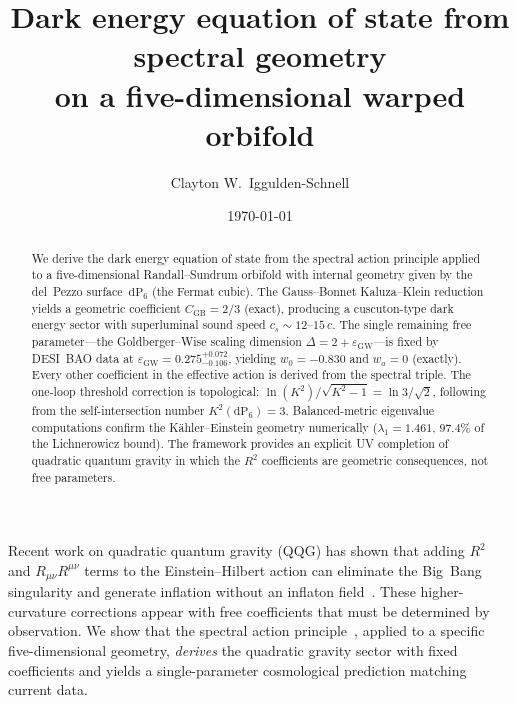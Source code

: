 \documentclass[aps,prl,twocolumn,superscriptaddress]{revtex4-2}
\newcommand{\CGB}{C_{\mathrm{GB}}}
\newcommand{\epsGW}{\varepsilon_{\mathrm{GW}}}
\newcommand{\dP}{\mathrm{dP}_6}
\begin{document}
\title{Dark energy equation of state from spectral geometry\\on a five-dimensional warped orbifold}

\author{Clayton W.\ Iggulden-Schnell}

\date{\today}

\begin{abstract}
We derive the dark energy equation of state from the spectral action principle
applied to a five-dimensional Randall--Sundrum orbifold with internal geometry
given by the del~Pezzo surface~$\dP$ (the Fermat cubic).  The Gauss--Bonnet
Kaluza--Klein reduction yields a geometric coefficient $\CGB = 2/3$ (exact),
producing a cuscuton-type dark energy sector with superluminal sound speed
$c_s \sim 12$--$15\,c$.  The single remaining free parameter---the
Goldberger--Wise scaling dimension $\Delta = 2 + \epsGW$---is fixed by
DESI~BAO data at $\epsGW = 0.275^{+0.072}_{-0.106}$, yielding $w_0 = -0.830$
and $w_a = 0$ (exactly).  Every other coefficient in the effective action is
derived from the spectral triple.  The one-loop threshold correction is
topological: $\ln(K^2)/\sqrt{K^2 - 1} = \ln 3/\sqrt{2}$, following from the
self-intersection number $K^2(\dP) = 3$.  Balanced-metric eigenvalue
computations confirm the K\"ahler--Einstein geometry numerically
($\lambda_1 = 1.461$, 97.4\% of the Lichnerowicz bound).  The framework
provides an explicit UV completion of quadratic quantum gravity in which the
$R^2$ coefficients are geometric consequences, not free parameters.
\end{abstract}

\maketitle



Recent work on quadratic quantum gravity (QQG) has shown that adding
$R^2$ and $R_{\mu\nu}R^{\mu\nu}$ terms to the Einstein--Hilbert action can
eliminate the Big~Bang singularity and generate inflation without an inflaton
field~\cite{Afshordi2026}.  These higher-curvature corrections appear
with free coefficients that must be determined by observation.  We show that the
spectral action principle~\cite{CC1997,CC2010}, applied to a specific
five-dimensional geometry, \emph{derives} the quadratic gravity sector with
fixed coefficients and yields a single-parameter cosmological prediction
matching current data.
\end{document}
